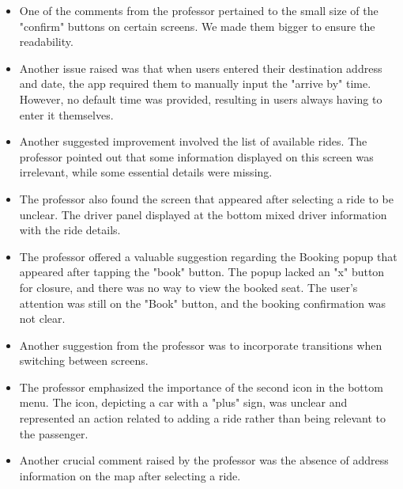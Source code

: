 \documentclass{article}
\begin{document}
\begin{itemize}
    \item One of the comments from the professor pertained to the small size of the "confirm" buttons on certain screens. We made them bigger to ensure the readability.
    \item Another issue raised was that when users entered their destination address and date, the app required them to manually input the "arrive by" time. However, no default time was provided, resulting in users always having to enter it themselves.
    \item Another suggested improvement involved the list of available rides. The professor pointed out that some information displayed on this screen was irrelevant, while some essential details were missing.
    \item The professor also found the screen that appeared after selecting a ride to be unclear. The driver panel displayed at the bottom mixed driver information with the ride details.
    \item  The professor offered a valuable suggestion regarding the Booking popup that appeared after tapping the "book" button. The popup lacked an "x" button for closure, and there was no way to view the booked seat. The user's attention was still on the "Book" button, and the booking confirmation was not clear.
    \item Another suggestion from the professor was to incorporate transitions when switching between screens.
    \item The professor emphasized the importance of the second icon in the bottom menu. The icon, depicting a car with a "plus" sign, was unclear and represented an action related to adding a ride rather than being relevant to the passenger.
    \item Another crucial comment raised by the professor was the absence of address information on the map after selecting a ride.
\end{itemize}
\end{document}
